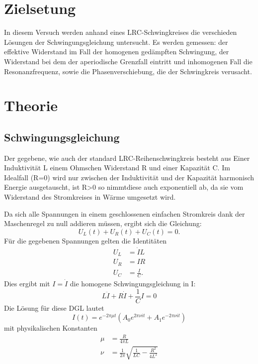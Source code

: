 \documentclass{scrartcl}
\begin{document}
          \section{Zielsetung}
          In diesem Versuch werden anhand eines LRC-Schwingkreises die verschieden Lösungen der Schwingungsgleichung untersucht.
          Es werden gemessen: der effektive Widerstand im Fall der homogenen gedämpften Schwingung,
          der Widerstand bei dem der aperiodische Grenzfall eintritt und inhomogenen Fall die Resonanzfrequenz, sowie die Phasenverschiebung,
          die der Schwingkreis verusacht.


          \section{Theorie}
          \subsection{Schwingungsgleichung}
          \label{sub:Schwingungsgleichung}

          \label{sec:Theorie}
          Der gegebene, wie auch der standard LRC-Reihenschwingkreis besteht aus Einer Induktivität L einem Ohmschen Widerstand R und einer Kapazität C.
          Im Idealfall (R=0) wird nur zwischen der Induktivität und der Kapazität harmonisch Energie ausgetauscht, ist R>0 so nimmtdiese auch exponentiell ab,
          da sie vom Widerstand des Stromkreises in Wärme umgesetzt wird.

          Da sich alle Spannungen in einem geschlossenen einfachen Stromkreis dank der Maschenregel zu null addieren müssen,
          ergibt sich die Gleichung:
          \begin{equation}
              U_L(t)+U_R(t)+U_C(t)=0.
              \label{eqn:Krichhoff2}
          \end{equation}
          Für die gegebenen Spannungen gelten die Identitäten
          \begin{align*}
              U_L &= \dot{I}L \\
              U_R &= IR  \\
              U_C &= \frac{I}{C}.
          \end{align*}
          Dies ergibt mit $I=\dot{I}$ die homogene Schwingungsgleichung in I:
          \begin{equation}
              L\ddot{I}+R\dot{I}+\frac{1}{C}I=0
              \label{eqn:Schwingungsgleichung}
          \end{equation}
          Die Lösung für diese DGL lautet
          \begin{equation}
              I(t)=e^{-2\pi\mu t}(A_0e^{2\pi\nu it}+A_1e^{-2\pi\nu it})
              \label{eqn:Fundamentalsys}
          \end{equation}
          mit physikalischen Konstanten
          \begin{align}
              \mu &= \frac{R}{4\pi L}\\
              \nu &= \frac{1}{2\pi}\sqrt{\frac{1}{LC}-\frac{R^2}{4L^2}}
          \end{align}
\end{document}
